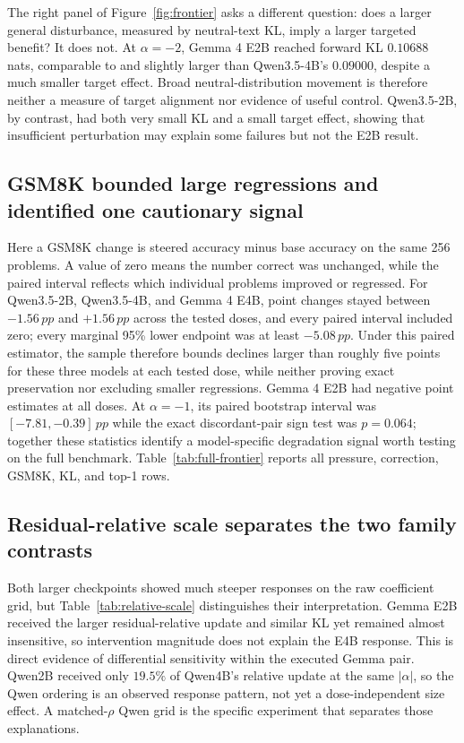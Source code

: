 \documentclass[11pt]{article}
\newcommand{\pp}{\,pp}
\begin{document}
The right panel of Figure~\ref{fig:frontier} asks a different question: does a
larger general disturbance, measured by neutral-text KL, imply a larger targeted
benefit? It does not. At
$\alpha=-2$, Gemma 4 E2B reached forward KL $0.10688$ nats, comparable to and
slightly larger than Qwen3.5-4B's $0.09000$, despite a much smaller target
effect. Broad neutral-distribution movement is therefore neither a measure of
target alignment nor evidence of useful control. Qwen3.5-2B, by contrast, had
both very small KL and a small target effect, showing that insufficient perturbation
may explain some failures but not the E2B result.

\subsection{GSM8K bounded large regressions and identified one cautionary signal}
\label{sec:gsm-results}

Here a GSM8K change is steered accuracy minus base accuracy on the same 256
problems. A value of zero means the number correct was unchanged, while the
paired interval reflects which individual problems improved or regressed.
For Qwen3.5-2B, Qwen3.5-4B, and Gemma 4 E4B, point changes stayed between
$-1.56\pp$ and $+1.56\pp$ across the tested doses, and every paired interval
included zero; every marginal 95\% lower endpoint was at least $-5.08\pp$.
Under this paired estimator, the sample therefore bounds declines larger than
roughly five points for these three models at each tested dose, while neither
proving exact preservation nor excluding smaller regressions. Gemma 4 E2B had negative
point estimates at all doses. At $\alpha=-1$, its paired bootstrap interval was
$[-7.81,-0.39]\pp$ while the exact discordant-pair sign test was $p=0.064$;
together these statistics identify a model-specific degradation signal worth
testing on the full benchmark. Table~\ref{tab:full-frontier} reports all
pressure, correction, GSM8K, KL, and top-1 rows.

\subsection{Residual-relative scale separates the two family contrasts}
\label{sec:size-results}

Both larger checkpoints showed much steeper responses on the raw coefficient
grid, but Table~\ref{tab:relative-scale} distinguishes their interpretation.
Gemma E2B received the larger residual-relative update and similar KL yet
remained almost insensitive, so intervention magnitude does not explain the
E4B response. This is direct evidence of differential sensitivity within the
executed Gemma pair. Qwen2B received only $19.5\%$ of Qwen4B's relative update
at the same $|\alpha|$, so the Qwen ordering is an observed response pattern,
not yet a dose-independent size effect. A matched-$\rho$ Qwen grid is the
specific experiment that separates those explanations.
\end{document}
